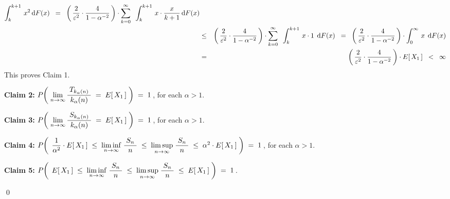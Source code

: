 \begin{enumerate}
\begin{eqnarray*}
		\int_{k}^{k+1}\, x^{2} \,\textnormal{d} F(x)
	\;\; = \;\;
		\left(\,\dfrac{2}{\varepsilon^{2}} \cdot \dfrac{4}{1-\alpha^{-2}}\,\right) \cdot
		\overset{\infty}{\underset{k=0}{\sum}}\;\;
		\int_{k}^{k+1}\, x \cdot \dfrac{x}{k+1} \,\textnormal{d} F(x)
\\
& \leq &
	\left(\,\dfrac{2}{\varepsilon^{2}} \cdot \dfrac{4}{1-\alpha^{-2}}\,\right) \cdot
	\overset{\infty}{\underset{k=0}{\sum}}\;\;
	\int_{k}^{k+1}\, x \cdot 1 \;\,\textnormal{d} F(x)
	\;\; = \;\;
	\left(\,\dfrac{2}{\varepsilon^{2}} \cdot \dfrac{4}{1-\alpha^{-2}}\,\right) \cdot
	\int_{0}^{\infty}\, x \;\,\textnormal{d} F(x)
\\
& = &
		\left(\,\dfrac{2}{\varepsilon^{2}} \cdot \dfrac{4}{1-\alpha^{-2}}\,\right) \cdot E\!\left[\,X_{1}\,\right]
	\;\; < \;\;
		\infty
\end{eqnarray*}
This proves Claim 1.

\vskip 0.8cm
\noindent
\textbf{Claim 2:}\quad\quad
$P\!\left(\;
	\underset{n\rightarrow\infty}{\lim}\,
	\dfrac{{\color{white}.}T_{k_{\alpha}(n)}{\color{white}.}}{k_{\alpha}(n)} \;=\; E[\,X_{1}\,]
	\;\right)
\;=\;1$\,, for each $\alpha > 1$.

\vskip 0.8cm
\noindent
\textbf{Claim 3:}\quad\quad
$P\!\left(\;
	\underset{n\rightarrow\infty}{\lim}\,
	\dfrac{{\color{white}.}S_{k_{\alpha}(n)}{\color{white}.}}{k_{\alpha}(n)} \;=\; E[\,X_{1}\,]
	\;\right)
\;=\;1$\,, for each $\alpha > 1$.

\vskip 0.8cm
\noindent
\textbf{Claim 4:}\quad\quad
$P\!\left(\;\,
	\dfrac{1}{\alpha^{2}} \cdot E[\,X_{1}\,]
	\;\leq\;
		\underset{n\rightarrow\infty}{\liminf}\;
		\dfrac{{\color{white}.}S_{n}{\color{white}.}}{n}
	\;\leq\;
		\underset{n\rightarrow\infty}{\limsup}\;
		\dfrac{{\color{white}.}S_{n}{\color{white}.}}{n}
	\;\leq\;
		\alpha^{2} \cdot E[\,X_{1}\,]
	\;\right)
\;=\;1$\,, for each $\alpha > 1$.

\vskip 0.8cm
\noindent
\textbf{Claim 5:}\quad\quad
$P\!\left(\;\,
	E[\,X_{1}\,]
	\;\leq\;
		\underset{n\rightarrow\infty}{\liminf}\;
		\dfrac{{\color{white}.}S_{n}{\color{white}.}}{n}
	\;\leq\;
		\underset{n\rightarrow\infty}{\limsup}\;
		\dfrac{{\color{white}.}S_{n}{\color{white}.}}{n}
	\;\leq\;
		E[\,X_{1}\,]
	\;\right)
\;=\;1$\,.

\end{enumerate}

\qed

\renewcommand{\theenumi}{\roman{enumi}}
\renewcommand{\labelenumi}{\textnormal{(\theenumi)}$\;\;$}

